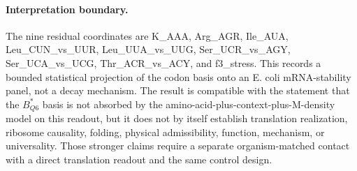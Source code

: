 \paragraph{Interpretation boundary.} The nine residual coordinates are K\_AAA, Arg\_AGR, Ile\_AUA, Leu\_CUN\_vs\_UUR, Leu\_UUA\_vs\_UUG, Ser\_UCR\_vs\_AGY, Ser\_UCA\_vs\_UCG, Thr\_ACR\_vs\_ACY, and f3\_stress. This records a bounded statistical projection of the codon basis onto an E. coli mRNA-stability panel, not a decay mechanism. The result is compatible with the statement that the $B^\ast_{Q6}$ basis is not absorbed by the amino-acid-plus-context-plus-M-density model on this readout, but it does not by itself establish translation realization, ribosome causality, folding, physical admissibility, function, mechanism, or universality. Those stronger claims require a separate organism-matched contact with a direct translation readout and the same control design.